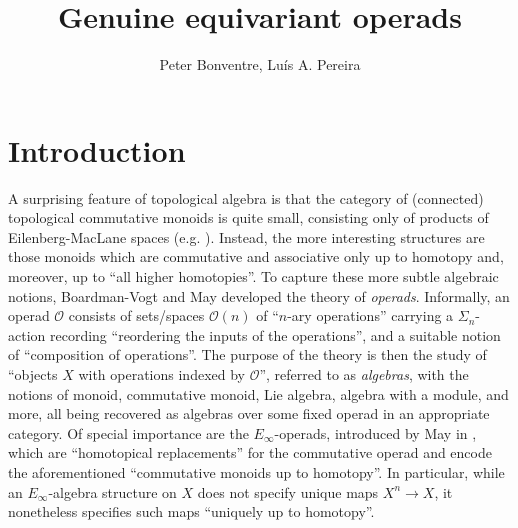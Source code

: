 \documentclass[a4paper,10pt
,draft
]{article}%
\author{Peter Bonventre, Lu\'is A. Pereira}%
\title{Genuine equivariant operads}%
\numberwithin{equation}{section}
\numberwithin{figure}{section}
\theoremstyle{definition} %
\newcommand{\Op}{\mathsf{Op}}%
\newcommand{\V}{\ensuremath{\mathcal V}}
\renewcommand{\O}{\ensuremath{\mathcal O}}
\newcommand{\1}{\ensuremath{\mathbbm 1}}%
\begin{document}
\maketitle%





\tableofcontents

\section{Introduction}


A surprising feature of topological algebra is that
the category of (connected) topological commutative monoids is quite small,
consisting only of products of Eilenberg-MacLane spaces (e.g. \cite[4K.6]{Hatcher}).
Instead, the more interesting structures are
those monoids which are commutative and associative only up to homotopy and, moreover, up to ``all higher homotopies''.
To capture these more subtle algebraic notions, Boardman-Vogt \cite{BV73} and May \cite{May72} developed
the theory of \textit{operads}\index{categories!Operad@$\O \in \Op(\V)$}.
Informally, an operad $\O$ consists of
sets/spaces $\O(n)$ of ``$n$-ary operations'' carrying a $\Sigma_n$-action recording
``reordering the inputs of the operations'',
and a suitable notion of ``composition of operations''.
The purpose of the theory is then the study of 
``objects $X$ with operations indexed by $\O$'',
referred to as \textit{algebras}, with the notions of monoid, commutative monoid, Lie algebra, algebra with a module, and more,
all being recovered as algebras over some fixed operad in an appropriate category.
Of special importance are the 
$E_\infty$-operads, introduced by 
May in \cite{May72}, which are 
``homotopical replacements'' for the commutative operad
 and encode the aforementioned
 ``commutative monoids up to homotopy''.
In particular, while an
 $E_\infty$-algebra structure on $X$ does not specify unique maps $X^n \to X$, 
 it nonetheless specifies such maps ``uniquely up to homotopy''.
\end{document}
